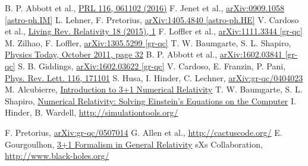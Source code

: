 \documentclass[aps,twocolumn,secnumarabic,nobalancelastpage,amsmath,amssymb,
nofootinbib]{revtex4}
\begin{document}
	
	
			
	\begin{thebibliography}{99}
		B. P. Abbott et al., \href{http://journals.aps.org/prl/pdf/10.1103/PhysRevLett.116.061102}{PRL 116, 061102 (2016)}
		F. Jenet et al., \href{http://arxiv.org/abs/0909.1058}{arXiv:0909.1058 [astro-ph.IM]} 
		 L. Lehner, F. Pretorius, \href{http://arxiv.org/pdf/1405.4840.pdf}{arXiv:1405.4840 [astro-ph.HE]} 
		  V. Cardoso et al., \href{http://journals.aps.org/prl/abstract/10.1103/PhysRevLett.93.174102}{Living Rev. Relativity 18 (2015), 1} 
		F. Loffler et al., \href{http://arxiv.org/pdf/1111.3344v1.pdf}{	arXiv:1111.3344 [gr-qc]} 
		 M. Zilhao, F. Loffler, \href{http://arxiv.org/abs/1305.5299}{arXiv:1305.5299 [gr-qc]} 
		T. W. Baumgarte, S. L. Shapiro, \href{http://w.astro.berkeley.edu/~gmarcy/astro160/papers/binary_black_hole_mergers.pdf}{Physics Today, October 2011, page 32} 
		B. P. Abbott et al., \href{https://arxiv.org/abs/1602.03841}{arXiv:1602.03841 [gr-qc]} 
		 S. B. Giddings, \href{https://arxiv.org/abs/1602.03622}{arXiv:1602.03622 [gr-qc]}
		V. Cardoso, E. Franzin, P. Pani, \href{http://journals.aps.org/prl/abstract/10.1103/PhysRevLett.116.171101}{Phys. Rev. Lett. 116, 171101} 
		  S. Husa, I. Hinder, C. Lechner, \href{http://arxiv.org/pdf/gr-qc/0404023v2.pdf}{arXiv:gr-qc/0404023} 
		  M. Alcubierre, \href{http://www.amazon.com/Introduction-Numerical-Relativity-International-Monographs/dp/0199656150}{Introduction to 3+1 Numerical Relativity} 
		  T. W. Baumgarte, S. L. Shapiro, \href{http://www.amazon.com/Numerical-Relativity-Einsteins-Equations-Computer/dp/052151407X}{Numerical Relativity: Solving Einstein's Equations on the Computer} 
		 I. Hinder, B. Wardell, \href{ http://simulationtools.org/}{http://simulationtools.org/} 
		 
	     F. Pretorius, \href{https://arxiv.org/abs/gr-qc/0507014}{arXiv:gr-qc/0507014}  
		 G. Allen et al., \href{http://cactuscode.org/}{http://cactuscode.org/}  
		E. Gourgoulhon, \href{https://www.springer.com/us/book/9783642245244}{3+1 Formalism in General Relativity}
		sXs Collaboration, \href{http://www.black-holes.org/}{http://www.black-holes.org/}
	
	\end{thebibliography}

	
	
	
	
\end{document}
